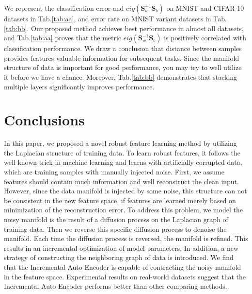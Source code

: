 \documentclass{article}
\def \SSS{\mathbf S}
\begin{document}
We represent the classification error and $eig(\SSS^{-1}_w\SSS_b)$
on MNIST and CIFAR-10 datasets in Tab.\ref{tab:aa},
and error rate on MNIST variant datasets in Tab.\ref{tab:bb}.
Our proposed method achieves best performance in almost all datasets,
and Tab.\ref{tab:aa} proves that the metric $eig(\SSS^{-1}_w\SSS_b)$ is positively correlated with classification performance.
We draw a conclusion that distance between samples provides features valuable information for subsequent tasks.
Since the manifold structure of data is important for good performance,
you may try to well utilize it before we have a chance.
Moreover,
Tab.\ref{tab:bb} demonstrates that stacking multiple layers significantly improves performance.


\section{Conclusions}
In this paper, we proposed a novel robust feature learning method by utilizing the Laplacian structure of training data. To learn robust features, it follows the well known trick in machine learning and learns with artificially corrupted data, which are training samples with manually injected noise. First, we assume features should contain much information and well reconstruct the clean input. However, since the data manifold is injected by some noise, this structure can not be consistent in the new feature space, if features are learned merely based on minimization of the reconstruction error. To address this problem, we model the noisy manifold is the result of a diffusion process on the Laplacian graph of training data. Then we reverse this specific diffusion process to denoise the manifold. Each time the diffusion process is reversed, the manifold is refined. This results in an incremental optimization of model parameters.  In addition, a new strategy of constructing the neighboring graph of data is introduced. We find that the Incremental Auto-Encoder is capable of contracting the noisy manifold in the feature space.  Experimental results on real-world datasets suggest that the Incremental Auto-Encoder performs better than other comparing methods.





\end{document}
